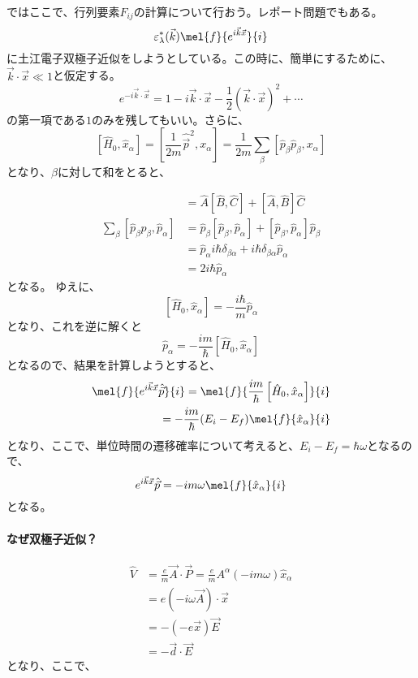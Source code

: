 \documentclass[titlepage]{ltjsarticle}
\begin{document}
ではここで、行列要素\(F_{ij}\)の計算について行おう。レポート問題でもある。
\begin{equation}
  \varepsilon^*_\lambda(\vec{k}) \mel{f}{e^{i \vec{k}\vec{x}}}{i}
\end{equation}
に土江電子双極子近似をしようとしている。この時に、簡単にするために、\(\vec{k}\cdot \vec{x}\ll 1\)と仮定する。
\begin{equation}
  e^{-i \vec{k}\cdot \vec{x}} = 1 - i \vec{k}\cdot \vec{x} - \frac{1}{2}(\vec{k}\cdot \vec{x})^2 + \cdots
\end{equation}
の第一項である\(1\)のみを残してもいい。さらに、
\begin{equation}
  \left[ \hat{H}_0, \hat{x}_\alpha \right]  = \left[ \frac{1}{2m} \hat{\vec{p}}^2 , x_\alpha  \right] = \frac{1}{2m}\sum_\beta \left[ \hat{p}_\beta \hat{p}_\beta, x_\alpha \right] 
\end{equation}
となり、\(\beta\)に対して和をとると、

\begin{align}
  [\hat{A}\hat{B},\hat{C}] & = \hat{A} \left[ \hat{B} , \hat{C} \right] + \left[ \hat{A} , \hat{B} \right] \hat{C} \\
  \sum_\beta [\hat{p}_\beta \hat{p}_\beta , \hat{p}_\alpha] & = \hat{p}_\beta [\hat{p}_\beta , \hat{p}_\alpha] + [\hat{p}_\beta , \hat{p}_\alpha] \hat{p}_\beta \\
  & = \hat{p}_\alpha i \hbar \delta_{\beta \alpha} + i \hbar \delta_{\beta \alpha} \hat{p}_\alpha \\
  & = 2i \hbar \hat{p}_\alpha
\end{align}
となる。
ゆえに、
\begin{equation}
  \left[ \hat{H}_0,\hat{x}_\alpha \right] = - \frac{i \hbar}{m} \hat{p}_\alpha
\end{equation}
となり、これを逆に解くと
\begin{equation}
  \hat{p}_\alpha = -\frac{i m}{\hbar} \left[ \hat{H}_0 , \hat{x}_\alpha \right]
\end{equation}
となるので、結果を計算しようとすると、
\begin{align}
  \mel{f}{e^{i \vec{k}\vec{x}}\hat{\vec{p}}}{i} = \mel{f}{ \frac{i m}{\hbar} \left[ \hat{H}_0,\hat{x}_\alpha \right]}{i} \\
  = -\frac{im}{\hbar}(E_i-E_f) \mel{f}{\hat{x}_\alpha}{i}
\end{align}
となり、ここで、単位時間の遷移確率について考えると、\(E_i-E_f = \hbar \omega\)となるので、
\begin{equation}
  e^{i \vec{k}\vec{x}}\hat{\vec{p}} = -im\omega \mel{f}{\hat{x}_\alpha}{i}
\end{equation}
となる。

\paragraph{なぜ双極子近似？}
\begin{align}
  \hat{V}& = \frac{e}{m} \vec{A} \cdot \vec{P} = \frac{e}{m} A^\alpha (-im\omega) \hat{x}_\alpha \\
  & = e(-i\omega \vec{A})\cdot \vec{x}\\
  & = -(-e \vec{x}) \vec{E} \\
  & = - \vec{d} \cdot \vec{E}
\end{align}
となり、ここで、
\end{document}
